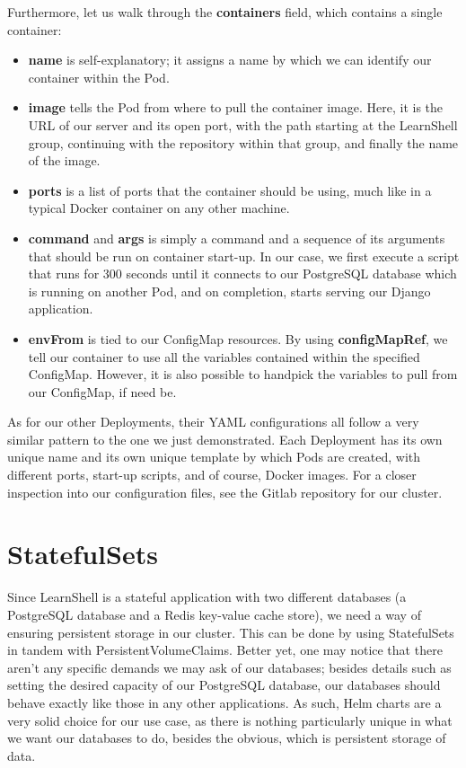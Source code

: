 \documentclass[thesis=B,english]{FITthesis}[2019/12/23]
\begin{document}
Furthermore, let us walk through the \textbf{containers} field, which contains a single container:

\begin{itemize}
  \setlength\itemsep{0em}
  \item \textbf{name} is self-explanatory; it assigns a name by which we can identify our container within the Pod.
  \item \textbf{image} tells the Pod from where to pull the container image. Here, it is the URL of our server and its open port, with the path starting at the LearnShell group, continuing with the repository within that group, and finally the name of the image.
  \item \textbf{ports} is a list of ports that the container should be using, much like in a typical Docker container on any other machine.
  \item \textbf{command} and \textbf{args} is simply a command and a sequence of its arguments that should be run on container start-up. In our case, we first execute a script that runs for 300 seconds until it connects to our PostgreSQL database which is running on another Pod, and on completion, starts serving our Django application.
  \item \textbf{envFrom} is tied to our ConfigMap resources. By using \textbf{configMapRef}, we tell our container to use all the variables contained within the specified ConfigMap. However, it is also possible to handpick the variables to pull from our ConfigMap, if need be.
\end{itemize}

As for our other Deployments, their YAML configurations all follow a very similar pattern to the one we just demonstrated. Each Deployment has its own unique name and its own unique template by which Pods are created, with different ports, start-up scripts, and of course, Docker images. For a closer inspection into our configuration files, see the Gitlab repository for our cluster.

\clearpage

\section{StatefulSets}

Since LearnShell is a stateful application with two different databases (a PostgreSQL database and a Redis key-value cache store), we need a way of ensuring persistent storage in our cluster. This can be done by using StatefulSets in tandem with PersistentVolumeClaims. Better yet, one may notice that there aren't any specific demands we may ask of our databases; besides details such as setting the desired capacity of our PostgreSQL database, our databases should behave exactly like those in any other applications. As such, Helm charts are a very solid choice for our use case, as there is nothing particularly unique in what we want our databases to do, besides the obvious, which is persistent storage of data.
\end{document}

